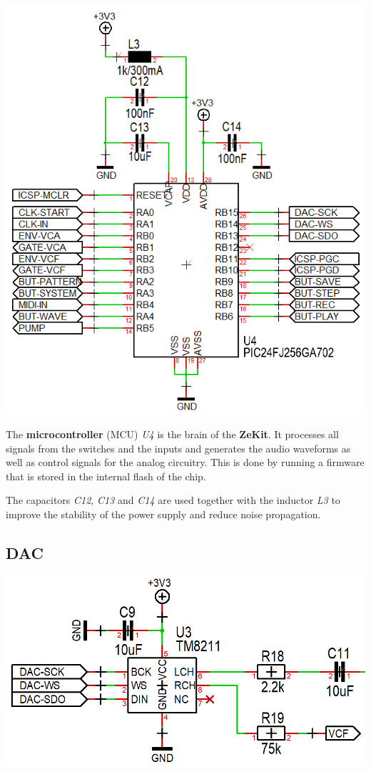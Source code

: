 \documentclass{scrartcl}
\begin{document}
\begin{center}
    \includegraphics[scale=0.50]{assets/schema-mcu.png}
\end{center}

The \textbf{microcontroller} (MCU) \emph{U4} is the brain of the \textbf{ZeKit}. It processes all signals from the switches and the inputs and generates the audio waveforms as well as control signals for the analog circuitry. This is done by running a firmware that is stored in the internal flash of the chip.

The capacitors \emph{C12}, \emph{C13} and \emph{C14} are used together with the inductor \emph{L3} to improve the stability of the power supply and reduce noise propagation.

\subsection{DAC}

\begin{center}
    \includegraphics[scale=0.30]{assets/schema-dac.png}
\end{center}
\end{document}
